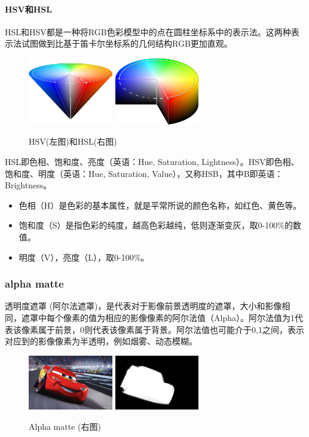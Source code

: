 \documentclass[scheme=chinese,a4paper]{article}
\begin{document}
\paragraph{HSV和HSL}
HSL和HSV都是一种将RGB色彩模型中的点在圆柱坐标系中的表示法。这两种表示法试图做到比基于笛卡尔坐标系的几何结构RGB更加直观。

\begin{figure}[H]
\centering
\includegraphics[width=0.33\textwidth]{HSV_cone.png}
\includegraphics[width=0.33\textwidth]{HSV_cylinder.png}
\caption{HSV(左图)和HSL(右图)}
\end{figure}
HSL即色相、饱和度、亮度（英语：Hue, Saturation, Lightness）。HSV即色相、饱和度、明度（英语：Hue, Saturation, Value），又称HSB，其中B即英语：Brightness。
\begin{itemize}
  \item 色相（H）是色彩的基本属性，就是平常所说的颜色名称，如红色、黄色等。
  \item 饱和度（S）是指色彩的纯度，越高色彩越纯，低则逐渐变灰，取0-100\%的数值。  
  \item 明度（V），亮度（L），取0-100\%。 
\end{itemize}
\subsubsection{alpha matte} 透明度遮罩\cite{matting} (阿尔法遮罩)，是代表对于影像前景透明度的遮罩，大小和影像相同，遮罩中每个像素的值为相应的影像像素的阿尔法值（Alpha）。阿尔法值为1代表该像素属于前景，0则代表该像素属于背景。阿尔法值也可能介于0,1之间，表示对应到的影像像素为半透明，例如烟雾、动态模糊。
\begin{figure}[H]
\centering
\includegraphics[width=0.33\textwidth]{source13_compressed.jpg}
\includegraphics[width=0.33\textwidth]{alpha013.jpg}
\caption{Alpha matte (右图)}
\end{figure}
\end{document}
